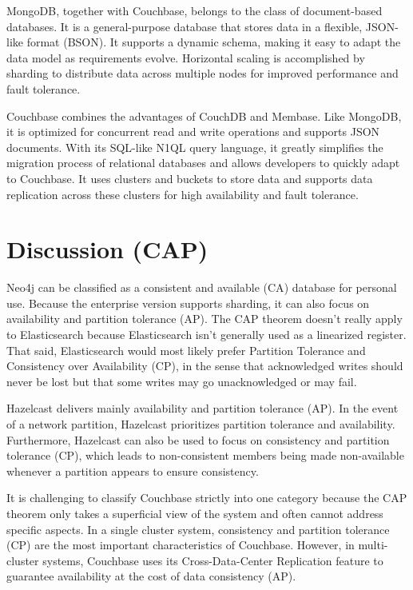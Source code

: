 MongoDB, together with Couchbase, belongs to the class of document-based databases. It is a general-purpose database that stores data in a flexible, JSON-like format (BSON). It supports a dynamic schema, making it easy to adapt the data model as requirements evolve. Horizontal scaling is accomplished by sharding to distribute data across multiple nodes for improved performance and fault tolerance. 

Couchbase combines the advantages of CouchDB and Membase. Like MongoDB, it is optimized for concurrent read and write operations and supports JSON documents. With its SQL-like N1QL query language, it greatly simplifies the migration process of relational databases and allows developers to quickly adapt to Couchbase. It uses clusters and buckets to store data and supports data replication across these clusters for high availability and fault tolerance. 
\section*{Discussion (CAP)}
Neo4j can be classified as a consistent and available (\ac{CA}) database for personal use. Because the enterprise version supports sharding, it can also focus on availability and partition tolerance (\ac{AP}). 
The \ac{CAP} theorem doesn’t really apply to Elasticsearch because Elasticsearch isn't generally used as a linearized register. That said, Elasticsearch would most likely prefer Partition Tolerance and Consistency over Availability (\ac{CP}), in the sense that acknowledged writes should never be lost but that some writes may go unacknowledged or may fail. 

Hazelcast delivers mainly availability and partition tolerance (\ac{AP}). In the event of a network partition, Hazelcast prioritizes partition tolerance and availability. Furthermore, Hazelcast can also be used to focus on consistency and partition tolerance (\ac{CP}), which leads to non-consistent members being made non-available whenever a partition appears to ensure consistency. 

It is challenging to classify Couchbase strictly into one category because the \ac{CAP} theorem only takes a superficial view of the system and often cannot address specific aspects. In a single cluster system, consistency and partition tolerance (\ac{CP}) are the most important characteristics of Couchbase. However, in multi-cluster systems, Couchbase uses its Cross-Data-Center Replication feature to guarantee availability at the cost of data consistency (\ac{AP}).

